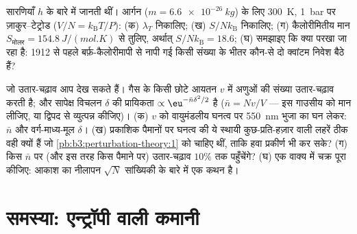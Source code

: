 \begin{exercise}[$\star\star\star$]\label{exo:b3:microcanonical-ensemble:11}
सारणियाँ $h$ के बारे में जानती थीं। आर्गन ($m =
\qty{6.6e-26}{kg}$) के लिए \qty{300}{K}, \qty{1}{bar} पर ज़ाकुर--टेट्रोड ($V/N =
k_{\text{B}}T/P$): (क) $\lambda_T$ निकालिए; (ख) $S/N
k_{\text{B}}$ निकालिए; (ग) कैलोरीमितीय मान
$S_{\text{मोलर}} = \qty{154.8}{J/(mol.K)}$ से तुलिए, अर्थात् $S/Nk_{\text{B}}
= 18.6$; (घ) समझाइए कि क्या परखा जा रहा है: 1912 से पहले बर्फ़-कैलोरीमापी
से नापी गई किसी संख्या के भीतर कौन-से दो क्वांटम निवेश बैठे हैं?
\end{exercise}

\begin{exercise}[$\star\star\star$]\label{exo:b3:microcanonical-ensemble:12}
जो उतार-चढ़ाव आप देख सकते हैं। गैस के किसी छोटे आयतन
$v$ में अणुओं की संख्या उतार-चढ़ाव करती है; और सापेक्ष विचलन
$\delta$ की प्रायिकता $\propto\eu^{-\bar n\delta^2/2}$ है ($\bar n = Nv/V$ ---
इस गाउसीय को मान लीजिए, या द्विपद से व्युत्पन्न कीजिए)। (क) $v$ को
वायुमंडलीय घनत्व पर \qty{550}{nm} भुजा का घन लेकर: $\bar n$ और
वर्ग-माध्य-मूल $\delta$। (ख) प्रकाशिक पैमानों पर घनत्व की ये स्थायी
कुछ-प्रति-हज़ार वाली लहरें ठीक वही क्यों हैं जो
\cref{pb:b3:perturbation-theory:1} को चाहिए थीं, ताकि हवा प्रकीर्ण भी
कर सके? (ग) किस $\bar n$ पर (और इस तरह किस पैमाने पर) उतार-चढ़ाव
$10\%$ तक पहुँचेंगे? (घ) एक वाक्य में चक्र पूरा कीजिए: आकाश का
नीलापन $\sqrt N$ सांख्यिकी के बारे में एक कथन है।
\end{exercise}

\section{समस्या: एन्ट्रॉपी वाली कमानी}

